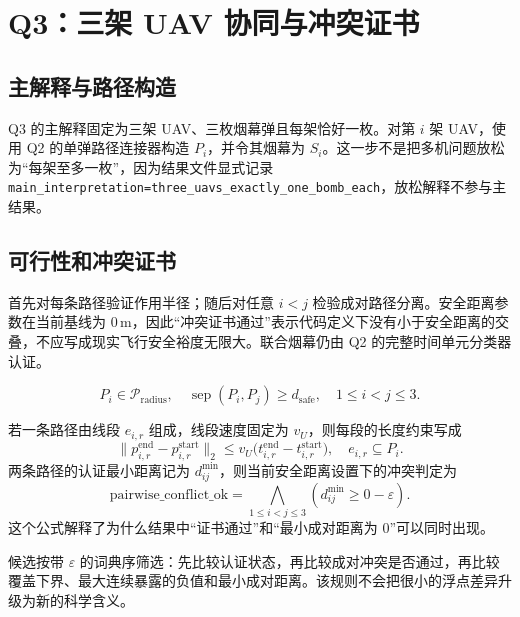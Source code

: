 \section{Q3：三架 UAV 协同与冲突证书}

\subsection{主解释与路径构造}

Q3 的主解释固定为三架 UAV、三枚烟幕弹且每架恰好一枚。对第 $i$ 架 UAV，使用 Q2 的单弹路径连接器构造 $P_i$，并令其烟幕为 $S_i$。这一步不是把多机问题放松为“每架至多一枚”，因为结果文件显式记录 \texttt{main\_interpretation=three\_uavs\_exactly\_one\_bomb\_each}，放松解释不参与主结果。

\subsection{可行性和冲突证书}

首先对每条路径验证作用半径；随后对任意 $i<j$ 检验成对路径分离。安全距离参数在当前基线为 $0\,\mathrm{m}$，因此“冲突证书通过”表示代码定义下没有小于安全距离的交叠，不应写成现实飞行安全裕度无限大。联合烟幕仍由 Q2 的完整时间单元分类器认证。

\begin{equation}
  P_i\in\mathcal{P}_{\mathrm{radius}},\quad
  \operatorname{sep}(P_i,P_j)\ge d_{\mathrm{safe}},\quad
  1\le i<j\le3.
  \label{eq:q3-conflict}
\end{equation}

若一条路径由线段 $e_{i,r}$ 组成，线段速度固定为 $v_U$，则每段的长度约束写成
\begin{equation}
  \|p_{i,r}^{\mathrm{end}}-p_{i,r}^{\mathrm{start}}\|_2
  \le v_U\bigl(t_{i,r}^{\mathrm{end}}-t_{i,r}^{\mathrm{start}}\bigr),
  \quad e_{i,r}\subseteq P_i.
  \label{eq:q3-segment}
\end{equation}
两条路径的认证最小距离记为 $d_{ij}^{\min}$，则当前安全距离设置下的冲突判定为
\begin{equation}
  \mathrm{pairwise\_conflict\_ok}
  =\bigwedge_{1\le i<j\le3}\left(d_{ij}^{\min}\ge0-\varepsilon\right).
  \label{eq:q3-pairwise}
\end{equation}
这个公式解释了为什么结果中“证书通过”和“最小成对距离为 $0$”可以同时出现。

候选按带 $\varepsilon$ 的词典序筛选：先比较认证状态，再比较成对冲突是否通过，再比较覆盖下界、最大连续暴露的负值和最小成对距离。该规则不会把很小的浮点差异升级为新的科学含义。

